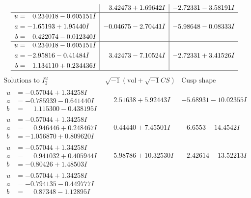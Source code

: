 \documentclass[1p]{elsarticle_modified}
\theoremstyle{definition}
\newcommand{\I}{\sqrt{-1}}
\begin{document}
$$\begin{array}{c|c|c}
 & \phantom{-}3.42473 + 1.69642 I & -2.72331 - 3.58191 I \\ \hline\begin{aligned}
u &= \phantom{-}0.234018 - 0.605151 I \\
a &= -1.65193 + 1.95440 I \\
b &= \phantom{-}0.422074 - 0.012340 I\end{aligned}
 & -0.04675 - 2.70441 I & -5.98648 - 0.08333 I \\ \hline\begin{aligned}
u &= \phantom{-}0.234018 - 0.605151 I \\
a &= -2.95816 - 0.41484 I \\
b &= \phantom{-}1.134110 + 0.234436 I\end{aligned}
 & \phantom{-}3.42473 - 7.10524 I & -2.72331 + 3.41526 I\\
 \hline 
 \end{array}$$\newpage$$\begin{array}{c|c|c}  
\text{Solutions to }I^u_{2}& \I (\text{vol} + \sqrt{-1}CS) & \text{Cusp shape}\\
 \hline 
\begin{aligned}
u &= -0.57044 + 1.34258 I \\
a &= -0.785939 - 0.641440 I \\
b &= \phantom{-}1.115300 - 0.438195 I\end{aligned}
 & \phantom{-}2.51638 + 5.92443 I & -5.68931 - 10.02355 I \\ \hline\begin{aligned}
u &= -0.57044 + 1.34258 I \\
a &= \phantom{-}0.946446 + 0.248467 I \\
b &= -1.056870 + 0.809620 I\end{aligned}
 & \phantom{-}0.44440 + 7.45501 I & -6.6553 - 14.4542 I \\ \hline\begin{aligned}
u &= -0.57044 + 1.34258 I \\
a &= \phantom{-}0.941032 + 0.405944 I \\
b &= -0.80426 + 1.48503 I\end{aligned}
 & \phantom{-}5.98786 + 10.32530 I & -2.42614 - 13.52213 I \\ \hline\begin{aligned}
u &= -0.57044 + 1.34258 I \\
a &= -0.794135 - 0.449777 I \\
b &= \phantom{-}0.87348 - 1.12895 I\end{aligned}

\end{array}$$
\end{document}
